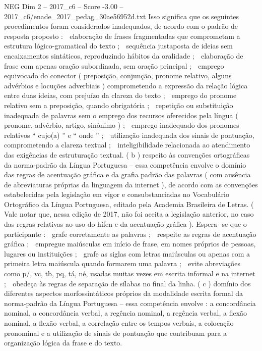\begin{textsample}{NEG Dim 2 – 2017\_c6 – Score -3.00 – 2017\_c6/enade\_2017\_pedag\_30ae56952d.txt}
Isso significa que os seguintes procedimentos foram considerados inadequados, de acordo com o padrão de resposta proposto :  elaboração de frases fragmentadas que comprometam a estrutura lógico-gramatical do texto ;  sequência justaposta de ideias sem encaixamentos sintáticos, reproduzindo hábitos da oralidade ;  elaboração de frase com apenas oração subordinada, sem oração principal ;  emprego equivocado do conector ( preposição, conjunção, pronome relativo, alguns advérbios e locuções adverbiais ) comprometendo a expressão da relação lógica entre duas ideias, com prejuízo da clareza do texto ;  emprego do pronome relativo sem a preposição, quando obrigatória ;  repetição ou substituição inadequada de palavras sem o emprego dos recursos oferecidos pela língua ( pronome, advérbio, artigo, sinônimo ) ;  emprego inadequado dos pronomes relativos “ cujo(a) ” e “ onde ” ;  utilização inadequada dos sinais de pontuação, comprometendo a clareza textual ;  inteligibilidade relacionada ao atendimento das exigências de estruturação textual. ( b ) respeito às convenções ortográficas da norma-padrão da Língua Portuguesa – essa competência envolve o domínio das regras de acentuação gráfica e da grafia padrão das palavras ( com ausência de abreviaturas próprias da linguagem da internet ), de acordo com as convenções estabelecidas pela legislação em vigor e consubstanciadas no Vocabulário Ortográfico da Língua Portuguesa, editado pela Academia Brasileira de Letras. ( Vale notar que, nessa edição de 2017, não foi aceita a legislação anterior, no caso das regras relativas ao uso do hífen e da acentuação gráfica ).
Espera -se que o participante :  grafe corretamente as palavras ;  respeite as regras de acentuação gráfica ;  empregue maiúsculas em início de frase, em nomes próprios de pessoas, lugares ou instituições ;  grafe as siglas com letras maiúsculas ou apenas com a primeira letra maiúscula quando formarem uma palavra ;  evite abreviações como p/, vc, tb, pq, tá, né, usadas muitas vezes em escrita informal e na internet ;  obedeça às regras de separação de sílabas no final da linha. ( c ) domínio dos diferentes aspectos morfossintáticos próprios da modalidade escrita formal da norma-padrão da Língua Portuguesa – essa competência envolve : a concordância nominal, a concordância verbal, a regência nominal, a regência verbal, a flexão nominal, a flexão verbal, a correlação entre os tempos verbais, a colocação pronominal e a utilização de sinais de pontuação que contribuam para a organização lógica da frase e do texto.

\end{textsample}
